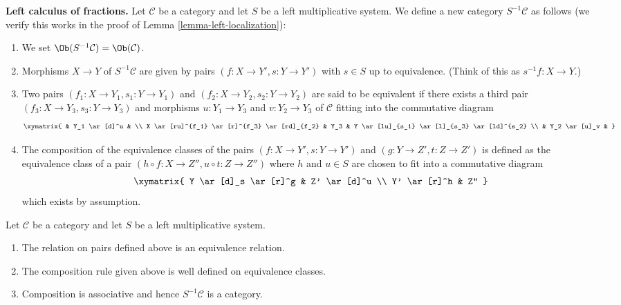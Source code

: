 \medskip\noindent
{\bf Left calculus of fractions.}
Let $\mathcal{C}$ be a category and let $S$ be a left multiplicative
system. We define a new category $S^{-1}\mathcal{C}$ as follows
(we verify this works in the proof of
Lemma \ref{lemma-left-localization}):
\begin{enumerate}
\item We set $\Ob(S^{-1}\mathcal{C}) = \Ob(\mathcal{C})$.
\item Morphisms $X \to Y$ of $S^{-1}\mathcal{C}$ are given by pairs
$(f : X \to Y', s : Y \to Y')$ with $s \in S$ up to equivalence.
(Think of this as $s^{-1}f : X \to Y$.)
\item Two pairs $(f_1 : X \to Y_1, s_1 : Y \to Y_1)$ and
$(f_2 : X \to Y_2, s_2 : Y \to Y_2)$ are said to be equivalent
if there exists a third pair $(f_3 : X \to Y_3, s_3 : Y \to Y_3)$
and morphisms $u : Y_1 \to Y_3$ and $v : Y_2 \to Y_3$ of $\mathcal{C}$
fitting into the commutative diagram
$$
\xymatrix{
 & Y_1 \ar[d]^u & \\
X \ar[ru]^{f_1} \ar[r]^{f_3} \ar[rd]_{f_2} &
Y_3 &
Y \ar[lu]_{s_1} \ar[l]_{s_3} \ar[ld]^{s_2} \\
& Y_2 \ar[u]_v &
}
$$
\item The composition of the equivalence classes of the pairs
$(f : X \to Y', s : Y \to Y')$ and $(g : Y \to Z', t : Z \to Z')$
is defined as the equivalence class of a pair
$(h \circ f : X \to Z'', u \circ t : Z \to Z'')$
where $h$ and $u \in S$ are chosen to fit into a commutative diagram
$$
\xymatrix{
Y \ar[d]_s \ar[r]^g & Z' \ar[d]^u \\
Y' \ar[r]^h & Z''
}
$$
which exists by assumption.
\end{enumerate}

\begin{lemma}
\label{lemma-left-localization}
Let $\mathcal{C}$ be a category and let $S$ be a left multiplicative
system.
\begin{enumerate}
\item The relation on pairs defined above is an equivalence relation.
\item The composition rule given above is well defined on equivalence
classes.
\item Composition is associative and hence $S^{-1}\mathcal{C}$
is a category.
\end{enumerate}
\end{lemma}

